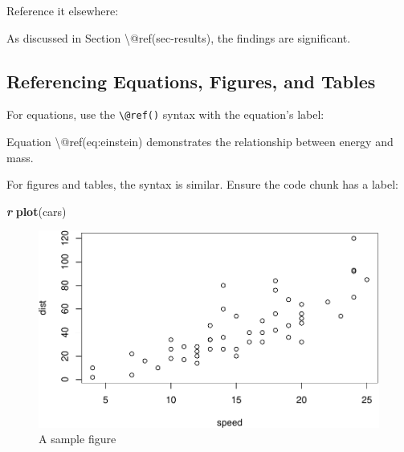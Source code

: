 \documentclass[
]{book}
\newenvironment{Shaded}{\begin{snugshade}}{\end{snugshade}}
\newcommand{\FunctionTok}[1]{\textcolor[rgb]{0.13,0.29,0.53}{\textbf{#1}}}
\newcommand{\InformationTok}[1]{\textcolor[rgb]{0.56,0.35,0.01}{\textbf{\textit{#1}}}}
\newcommand{\NormalTok}[1]{#1}
\theoremstyle{definition}
\theoremstyle{definition}
\theoremstyle{definition}
\theoremstyle{definition}
\theoremstyle{remark}
\begin{document}
Reference it elsewhere:

\begin{Shaded}
\begin{Highlighting}[]
\NormalTok{As discussed in Section \textbackslash{}@ref(sec{-}results), the findings are significant.}
\end{Highlighting}
\end{Shaded}

\subsection{Referencing Equations, Figures, and Tables}\label{referencing-equations-figures-and-tables}

For equations, use the \texttt{\textbackslash{}@ref()} syntax with the equation's label:

\begin{Shaded}
\begin{Highlighting}[]
\NormalTok{Equation \textbackslash{}@ref(eq:einstein) demonstrates the relationship between energy and mass.}
\end{Highlighting}
\end{Shaded}

For figures and tables, the syntax is similar. Ensure the code chunk has a label:

\begin{Shaded}
\begin{Highlighting}[]

\InformationTok{\textasciigrave{}\textasciigrave{}\textasciigrave{} r}
\FunctionTok{plot}\NormalTok{(cars)}
\end{Highlighting}
\end{Shaded}

\begin{figure}
\centering
\includegraphics{_main_files/figure-latex/figure-label-1.pdf}
\caption{\label{fig:figure-label}A sample figure}
\end{figure}
\end{document}
